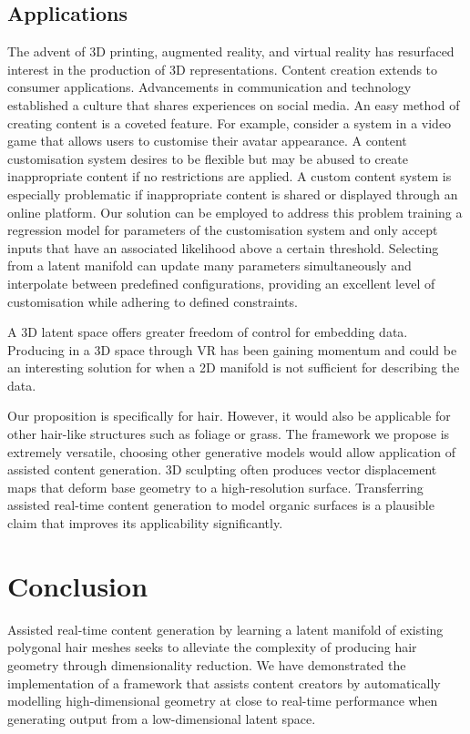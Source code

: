 \documentclass[ %
author={Dillon Keith Diep},
supervisor={Dr. Carl Henrik Ek},
degree={MEng},
title={ART-CG Hair:},
subtitle={Assisted Real-time Content Generation of Stylised Virtual Hair},
type={Research},
year={2017} ]{dissertation}
\begin{document}
\section{Applications}
\label{evaluation:application}
The advent of 3D printing, augmented reality, and virtual reality has resurfaced interest in the production of 3D representations. Content creation extends to consumer applications. Advancements in communication and technology established a culture that shares experiences on social media. An easy method of creating content is a coveted feature.
For example, consider a system in a video game that allows users to customise their avatar appearance. A content customisation system desires to be flexible but may be abused to create inappropriate content if no restrictions are applied. A custom content system is especially problematic if inappropriate content is shared or displayed through an online platform. Our solution can be employed to address this problem training a regression model for parameters of the customisation system and only accept inputs that have an associated likelihood above a certain threshold. Selecting from a latent manifold can update many parameters simultaneously and interpolate between predefined configurations, providing an excellent level of customisation while adhering to defined constraints.

A 3D latent space offers greater freedom of control for embedding data. Producing in a 3D space through VR has been gaining momentum and could be an interesting solution for when a 2D manifold is not sufficient for describing the data.

Our proposition is specifically for hair. However, it would also be applicable for other hair-like structures such as foliage or grass. The framework we propose is extremely versatile, choosing other generative models would allow application of assisted content generation. 3D sculpting often produces vector displacement maps that deform base geometry to a high-resolution surface. Transferring assisted real-time content generation to model organic surfaces is a plausible claim that improves its applicability significantly.


\chapter{Conclusion}
\label{chap:conclusion}
Assisted real-time content generation by learning a latent manifold of existing polygonal hair meshes seeks to alleviate the complexity of producing hair geometry through dimensionality reduction.
We have demonstrated the implementation of a framework that assists content creators by automatically modelling high-dimensional geometry at close to real-time performance when generating output from a low-dimensional latent space.
\end{document}

